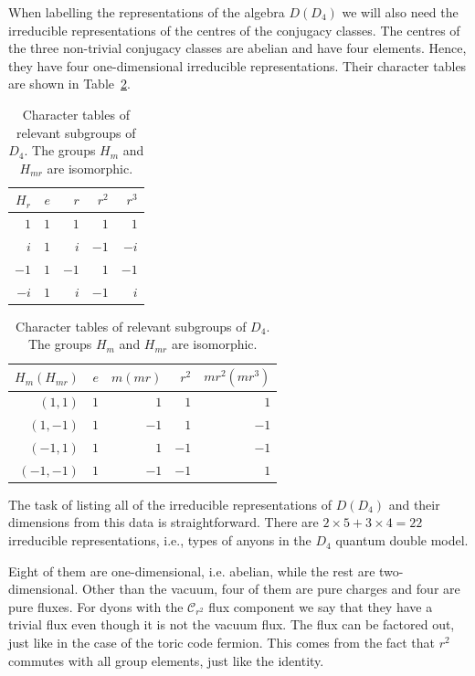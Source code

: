 \documentclass[two column]{article}
\begin{document}
When labelling the representations of the algebra $D(D_4)$ we will also need the irreducible representations of the centres of the conjugacy classes. The centres of the three non-trivial conjugacy classes are abelian and have four elements. Hence, they have four one-dimensional irreducible representations. Their character tables are shown in Table~\ref{tab:char_sub}.
\begin{table}[h]
\centering
\begin{tabular}{|r|rrrr|}\hline
  $H_r$ & $e$ & $r$ & $r^2$ & $r^3$ \\ \hline
$1$ & $1$   & $1$            & $1$             & $1$                                  \\ 
$i$ & $1$   & $i$            & $-1$             & $-i$                                  \\ 
$-1$ & $1$   & $-1$            & $1$             & $-1$                                  \\ 
$-i$ & $1$   & $i$            & $-1$             & $i$                                  \\ \hline
\end{tabular}
\begin{tabular}{|r|rrrr|}\hline
  $H_m (H_{mr})$ & $e$ & $m(mr)$ & $r^2$ & $mr^2(mr^3)$ \\ \hline
$(1,1)$ & $1$   & $1$            & $1$             & $1$                                  \\ 
$(1,-1)$ & $1$   & $-1$            & $1$             & $-1$                                  \\ 
$(-1,1)$ & $1$   & $1$            & $-1$             & $-1$                                  \\ 
$(-1,-1)$ & $1$   & $-1$            & $-1$             & $1$                                  \\ \hline
\end{tabular}
\caption{Character tables of relevant subgroups of $D_4$. The groups $H_m$ and $H_{mr}$ are isomorphic.}
\label{tab:char_sub}
\end{table}

The task of listing all of the irreducible representations of $D(D_4)$ and their dimensions from this data is straightforward. There are $2 \times 5  + 3 \times 4 = 22$ irreducible representations, i.e., types of anyons in the $D_4$ quantum double model.

Eight of them are one-dimensional, i.e. abelian, while the rest are two-dimensional. Other than the vacuum, four of them are pure charges and four are pure fluxes. For dyons with the $\mathcal{C}_{r^2}$ flux component we say that they have a trivial flux even though it is not the vacuum flux. The flux can be factored out, just like in the case of the toric code fermion. This comes from the fact that $r^2$ commutes with all group elements, just like the identity. 
\end{document}
